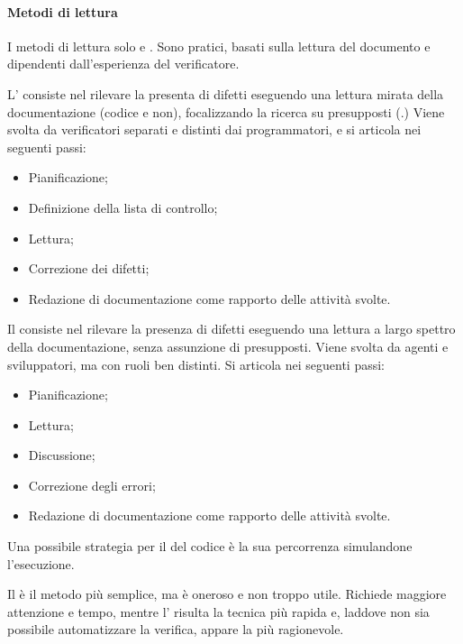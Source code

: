 \paragraph{Metodi di lettura}
\label{par:metodi_di_lettura}

I metodi di lettura solo  e
. Sono pratici, basati sulla lettura del documento
e dipendenti dall'esperienza del verificatore.

L' consiste nel rilevare la presenta di difetti eseguendo
una lettura mirata della documentazione (codice e non), focalizzando la ricerca
su presupposti (.) Viene svolta da verificatori
separati e distinti dai programmatori, e si articola nei seguenti passi:

\begin{itemize}
  \item Pianificazione;
  \item Definizione della lista di controllo;
  \item Lettura;
  \item Correzione dei difetti;
  \item Redazione di documentazione come rapporto delle attività svolte.
\end{itemize}


Il  consiste nel rilevare la presenza di difetti eseguendo
una lettura a largo spettro della documentazione, senza assunzione di
presupposti. Viene svolta da agenti e sviluppatori, ma con ruoli ben distinti.
Si articola nei seguenti passi:

\begin{itemize}
  \item Pianificazione;
  \item Lettura;
  \item Discussione;
  \item Correzione degli errori;
  \item Redazione di documentazione come rapporto delle attività svolte.
\end{itemize}

Una possibile strategia per il  del codice è la sua
percorrenza simulandone l'esecuzione.

Il  è il metodo più semplice, ma è oneroso e non troppo
utile. Richiede maggiore attenzione e tempo, mentre l'
risulta la tecnica più rapida e, laddove non sia possibile automatizzare la
verifica, appare la più ragionevole.

